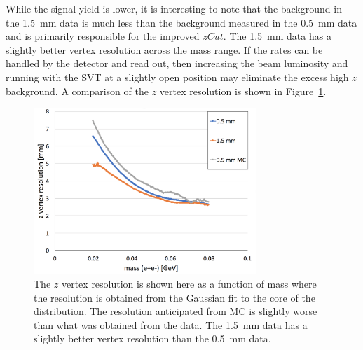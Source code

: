 %
%
While the signal yield is lower, it is interesting to note that the background in the 1.5~mm data is much less than the background measured in the 0.5~mm data and is primarily responsible for the improved $zCut$. The 1.5~mm data has a slightly better vertex resolution across the mass range. If the rates can be handled by the detector and read out, then increasing the beam luminosity and running with the SVT at a slightly open position may eliminate the excess high $z$ background. A comparison of the $z$ vertex resolution is shown in Figure~\ref{fig:vtxRes}. 

\begin{figure}[htb]
  \centering
      \includegraphics[width=0.75\textwidth]{pics/results/vtxRes.png}
  \caption[Vertex resolutions as measured in data and compared]{The $z$ vertex resolution is shown here as a function of mass where the resolution is obtained from the Gaussian fit to the core of the distribution. The resolution anticipated from MC is slightly worse than what was obtained from the data. The 1.5~mm data has a slightly better vertex resolution than the 0.5~mm data.}
  \label{fig:vtxRes}
\end{figure}

